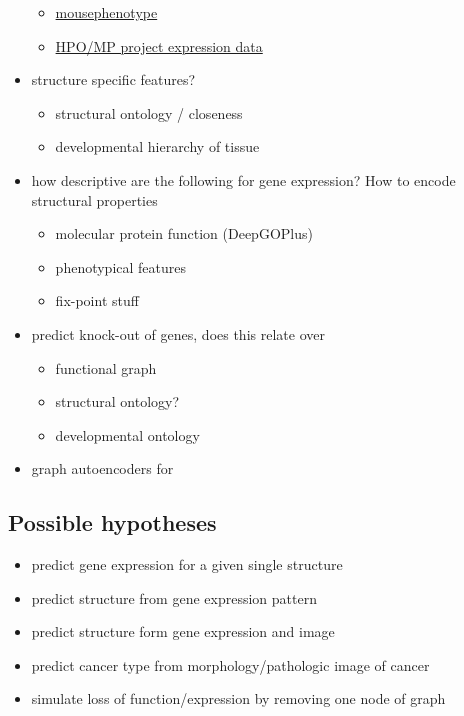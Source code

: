 \documentclass[]{article}
\renewcommand{\cite}{\citep}
\begin{document}
\begin{itemize}
\begin{itemize}
		\item \href{https://www.mousephenotype.org/}{mousephenotype}
		
		\item \href{http://www.informatics.jax.org/expression.shtml}{HPO/MP project expression data}
	\end{itemize}
	\item structure specific features?
	\begin{itemize}
		\item structural ontology / closeness
		\item developmental hierarchy of tissue
	\end{itemize}
	\item how descriptive are the following for gene expression? How to encode structural properties
	\begin{itemize}
		\item molecular protein function (DeepGOPlus)
		\item phenotypical features
		\item fix-point stuff
	\end{itemize}
	\item predict knock-out of genes, does this relate over 
	\begin{itemize}
		\item functional graph \cite{ValkShapingBrainStructure2020}
		\item structural ontology?
		\item developmental ontology
	\end{itemize}
	\item graph autoencoders for 
\end{itemize}

\subsection*{Possible hypotheses}
\begin{itemize}
	\item predict gene expression for a given single structure
	\item predict structure from gene expression pattern
	\item predict structure form gene expression and image
	\item predict cancer type from morphology/pathologic image of cancer
	\item simulate loss of function/expression by removing one node of graph
\end{itemize}
\end{document}
